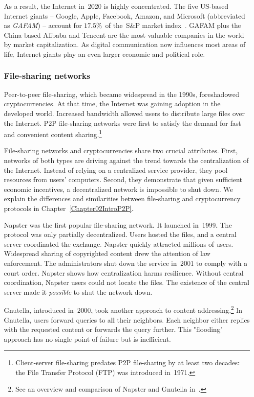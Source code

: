 As a result, the Internet in~2020 is highly concentrated.
The five US-based Internet giants -- Google, Apple, Facebook, Amazon, and Microsoft (abbreviated as \textit{GAFAM}) -- account for $17.5\%$~of the~S\&P market index~\cite{Levy2020}.
GAFAM plus the China-based Alibaba and Tencent are the most valuable companies in the world by market capitalization.
As digital communication now influences most areas of life, Internet giants play an even larger economic and political role.


\subsubsection*{File-sharing networks}
\label{sec:FileSharingNetworks}

Peer-to-peer file-sharing, which became widespread in the 1990s, foreshadowed cryptocurrencies.
At that time, the Internet was gaining adoption in the developed world.
Increased bandwidth allowed users to distribute large files over the Internet.
P2P file-sharing networks were first to satisfy the demand for fast and convenient content sharing.\footnote{Client-server file-sharing predates P2P file-sharing by at least two decades: the File Transfer Protocol (FTP) was introduced in~1971.}

File-sharing networks and cryptocurrencies share two crucial attributes.
First, networks of both types are driving against the trend towards the centralization of the Internet.
Instead of relying on a centralized service provider, they pool resources from users' computers.
Second, they demonstrate that given sufficient economic incentives, a decentralized network is impossible to shut down.
We explain the differences and similarities between file-sharing and cryptocurrency protocols in Chapter~\ref{Chapter02IntroP2P}.

Napster was the first popular file-sharing network.
It launched in~1999.
The protocol was only partially decentralized.
Users hosted the files, and a central server coordinated the exchange.
Napster quickly attracted millions of users.
Widespread sharing of copyrighted content drew the attention of law enforcement.
The administrators shut down the service in~2001 to comply with a court order.
Napster shows how centralization harms resilience.
Without central coordination, Napster users could not locate the files.
The existence of the central server made it \textit{possible} to shut the network down.

Gnutella, introduced in~2000, took another approach to content addressing.\footnote{See an overview and comparison of Napster and Gnutella in~\cite{Saroiu2003}.}
In Gnutella, users forward queries to all their neighbors.
Each neighbor either replies with the requested content or forwards the query further.
This "flooding" approach has no single point of failure but is inefficient.

